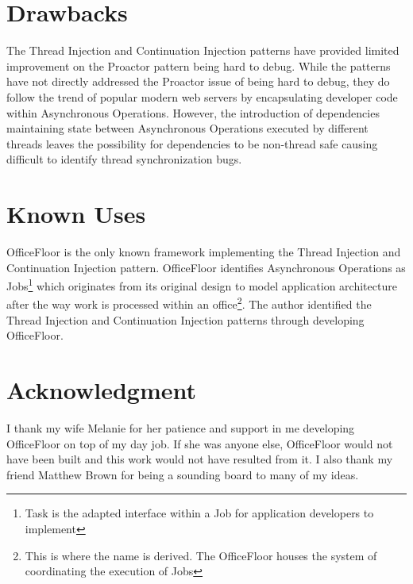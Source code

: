 \documentclass[prodmode]{style/acmlarge}
\begin{document}
\section{Drawbacks}

The Thread Injection and Continuation Injection patterns have provided limited
improvement on the Proactor pattern being hard to debug.  While the patterns
have not directly addressed the Proactor issue of being hard to debug, they do
follow the trend of popular modern web servers by encapsulating developer code
within Asynchronous Operations.  However, the introduction of dependencies
maintaining state between Asynchronous Operations executed by different threads
leaves the possibility for dependencies to be non-thread safe causing difficult
to identify thread synchronization bugs.


\section{Known Uses}

OfficeFloor \cite{officefloor} is the only known framework implementing the
Thread Injection and Continuation Injection pattern.  OfficeFloor identifies
Asynchronous Operations as Jobs\footnote{Task is the adapted interface within a
Job for application developers to implement} which originates from its original
design to model application architecture after the way work is processed within
an office\footnote{This is where the name is derived. The OfficeFloor houses the
system of coordinating the execution of Jobs}.  The author identified the Thread
Injection and Continuation Injection patterns through developing OfficeFloor.


\section*{Acknowledgment} I thank my wife Melanie for her patience and support
in me developing OfficeFloor on top of my day job.  If she was anyone else,
OfficeFloor would not have been built and this work would not have resulted from
it.  I also thank my friend Matthew Brown for being a sounding board to many of
my ideas.




\end{document}
